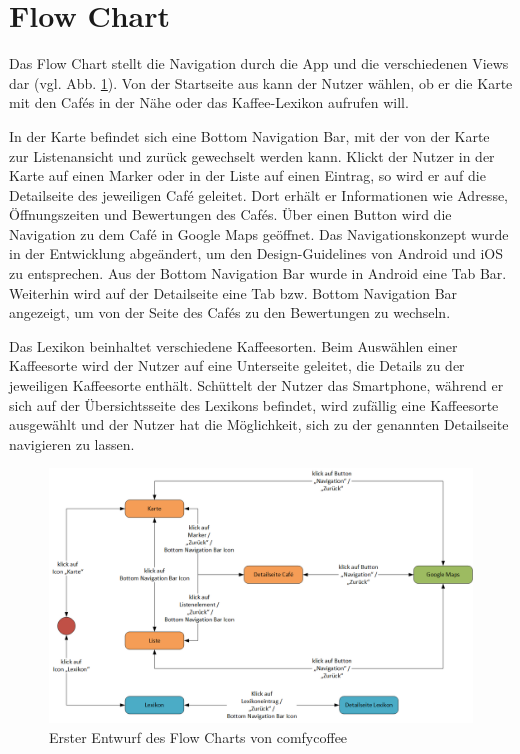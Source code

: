 \section{Flow Chart}
Das Flow Chart stellt die Navigation durch die App und die verschiedenen Views dar (vgl. Abb. \ref{fig:flowchart}). Von der Startseite aus kann der Nutzer wählen, ob er die Karte mit den Cafés in der Nähe oder das Kaffee-Lexikon aufrufen will.

In der Karte befindet sich eine Bottom Navigation Bar, mit der von der Karte zur Listenansicht und zurück gewechselt werden kann. Klickt der Nutzer in der Karte auf einen Marker oder in der Liste auf einen Eintrag, so wird er auf die Detailseite des jeweiligen Café geleitet. Dort erhält er Informationen wie Adresse, Öffnungszeiten und Bewertungen des Cafés. Über einen Button wird die Navigation zu dem Café in Google Maps geöffnet. Das Navigationskonzept wurde in der Entwicklung abgeändert, um den Design-Guidelines von Android und iOS zu entsprechen. Aus der Bottom Navigation Bar wurde in Android eine Tab Bar. Weiterhin wird auf der Detailseite eine Tab bzw. Bottom Navigation Bar angezeigt, um von der Seite des Cafés zu den Bewertungen zu wechseln.

Das Lexikon beinhaltet verschiedene Kaffeesorten. Beim Auswählen einer Kaffeesorte wird der Nutzer auf eine Unterseite geleitet, die Details zu der jeweiligen Kaffeesorte enthält. Schüttelt der Nutzer das Smartphone, während er sich auf der Übersichtsseite des Lexikons befindet, wird zufällig eine Kaffeesorte ausgewählt und der Nutzer hat die Möglichkeit, sich zu der genannten Detailseite navigieren zu lassen.

\begin{figure}[h!]
    \centering
		\includegraphics[width=\textwidth]{Bilder/flowchart.png}
		\caption{Erster Entwurf des Flow Charts von comfycoffee}
		\label{fig:flowchart}
\end{figure}

